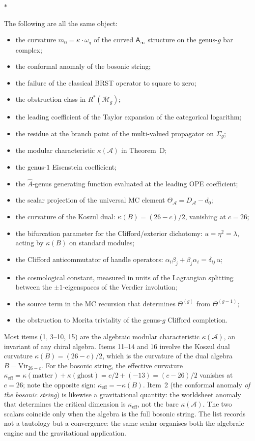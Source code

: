 \documentclass[11pt]{article}
\newcommand{\cA}{\mathcal{A}}
\newcommand{\cM}{\mathcal{M}}
\newcommand{\Ainf}{\mathsf{A}_{\infty}}
\newcommand{\sep}{\bigskip\begin{center}$*$\end{center}\medskip}
\begin{document}
\sep

The following are all the same object:

\begin{itemize}[nosep]
\item the curvature $m_0 = \kappa \cdot \omega_g$ of the curved
  $\Ainf$ structure on the genus-$g$ bar complex;
\item the conformal anomaly of the bosonic string;
\item the failure of the classical BRST operator to square to zero;
\item the obstruction class in $R^*(\overline{\cM}_g)$;
\item the leading coefficient of the Taylor expansion of the
  categorical logarithm;
\item the residue at the branch point of the multi-valued
  propagator on $\Sigma_g$;
\item the modular characteristic $\kappa(\cA)$ in Theorem~D;
\item the genus-$1$ Eisenstein coefficient;
\item the $\hat{A}$-genus generating function evaluated at the
  leading OPE coefficient;
\item the scalar projection of the universal MC element
  $\Theta_\cA = D_\cA - d_0$;
\item the curvature of the Koszul dual:
  $\kappa(B) = (26{-}c)/2$, vanishing at $c = 26$;
\item the bifurcation parameter for the Clifford/exterior
  dichotomy: $u = \eta^2 = \lambda$, acting by
  $\kappa(B)$ on standard modules;
\item the Clifford anticommutator of handle operators:
  $\alpha_i \beta_j + \beta_j \alpha_i = \delta_{ij}\,u$;
\item the cosmological constant, measured in units of the
  Lagrangian splitting between the $\pm 1$-eigenspaces
  of the Verdier involution;
\item the source term in the MC recursion that determines
  $\Theta^{(g)}$ from $\Theta^{(g-1)}$;
\item the obstruction to Morita triviality of the genus-$g$
  Clifford completion.
\end{itemize}

\medskip

Most items (1, 3--10, 15) are the algebraic modular
characteristic $\kappa(\cA)$, an invariant of any chiral algebra.
Items 11--14 and 16 involve the Koszul dual curvature
$\kappa(B) = (26{-}c)/2$, which is the curvature of the
dual algebra $B = \mathrm{Vir}_{26-c}$.
For the bosonic string, the effective curvature
$\kappa_{\mathrm{eff}} = \kappa(\mathrm{matter})
+ \kappa(\mathrm{ghost}) = c/2 + (-13) = (c{-}26)/2$
vanishes at $c = 26$; note the opposite sign:
$\kappa_{\mathrm{eff}} = -\kappa(B)$.
Item~2 (the conformal anomaly \emph{of the bosonic string}) is
likewise a gravitational quantity: the worldsheet anomaly that
determines the critical dimension is $\kappa_{\mathrm{eff}}$, not
the bare $\kappa(\cA)$.  The two scalars coincide only when the
algebra is the full bosonic string.  The list records not a
tautology but a convergence: the same scalar organises both the
algebraic engine and the gravitational application.
\end{document}
